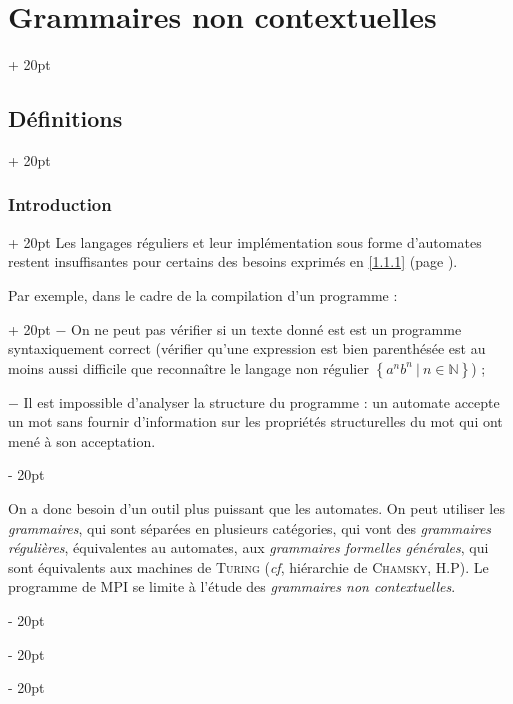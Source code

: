 \documentclass[a4paper, 12pt, twoside]{article}
\newcommand{\N}{\mathbb{N}} %
\newcommand{\set}[1]{\left\{ #1 \right\}}
\newcommand{\ind}[1][20pt]{\advance\leftskip + #1}
\newcommand{\deind}[1][20pt]{\advance\leftskip - #1}
\newenvironment{indt}[2][20pt]{#2 \par \ind[#1]}{\par \deind} %
\begin{document}
    \vspace{12pt}
    
    \begin{indt}{\section{Grammaires non contextuelles}}
        \begin{indt}{\subsection{Définitions}}
            \begin{indt}{\subsubsection{Introduction}}
                Les langages réguliers et leur implémentation sous forme d'automates restent insuffisantes pour certains des besoins exprimés en \ref{1.1.1} (page \pageref{1.1.1}).

                \begin{indt}{Par exemple, dans le cadre de la compilation d'un programme :}
                    $-$ On ne peut pas vérifier si un texte donné est est un programme syntaxiquement correct (vérifier qu'une expression est bien parenthésée est au moins aussi difficile que reconnaître le langage non régulier $\set{a^n b^n\ |\ n \in \N}$) ;

                    $-$ Il est impossible d'analyser la structure du programme : un automate accepte un mot sans fournir d'information sur les propriétés structurelles du mot qui ont mené à son acceptation.
                \end{indt}

                \vspace{12pt}
                
                On a donc besoin d'un outil plus puissant que les automates.
                On peut utiliser les \emph{grammaires}, qui sont séparées en plusieurs catégories, qui vont des \emph{grammaires régulières}, équivalentes au automates, aux \emph{grammaires formelles générales}, qui sont équivalents aux machines de \textsc{Turing} (\textit{cf}, hiérarchie de \textsc{Chamsky}, H.P).
                Le programme de MPI se limite à l'étude des \emph{grammaires non contextuelles}.
            \end{indt}

            \vspace{12pt}
            

\end{indt}
\end{indt}
\end{document}
